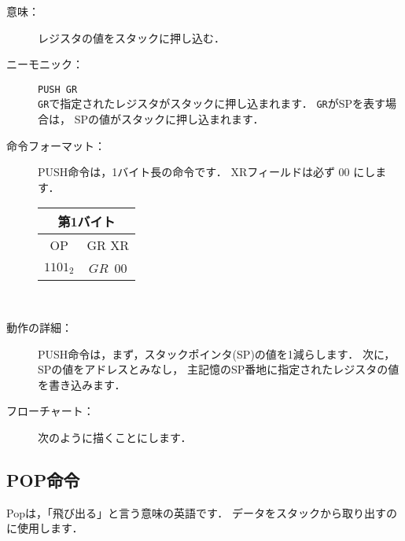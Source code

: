 \begin{description}
\item[意味：]レジスタの値をスタックに押し込む．

\item[ニーモニック：]{\tt PUSH  GR} \\
{\tt GR}で指定されたレジスタがスタックに押し込まれます．
{\tt GR}がSPを表す場合は，
SPの値がスタックに押し込まれます．

\item[命令フォーマット：]PUSH命令は，1バイト長の命令です．
XRフィールドは必ず 00 にします．

\begin{tabular}{|c|c|} \hline
\multicolumn{2}{|c|}{第1バイト} \\
\hline
OP & GR XR \\
\hline
$1101_2$ & $GR$~$00$ \\
\hline
\end{tabular}\\

\item[動作の詳細：]PUSH命令は，まず，スタックポインタ(SP)の値を1減らします．
次に，SPの値をアドレスとみなし，
主記憶のSP番地に指定されたレジスタの値を書き込みます．

\item[フローチャート：]
次のように描くことにします．

\begin{flushleft}
\epsfxsize=3cm
\end{flushleft}

\end{description}

\subsection{POP命令}

Popは，「飛び出る」と言う意味の英語です．
データをスタックから取り出すのに使用します．

